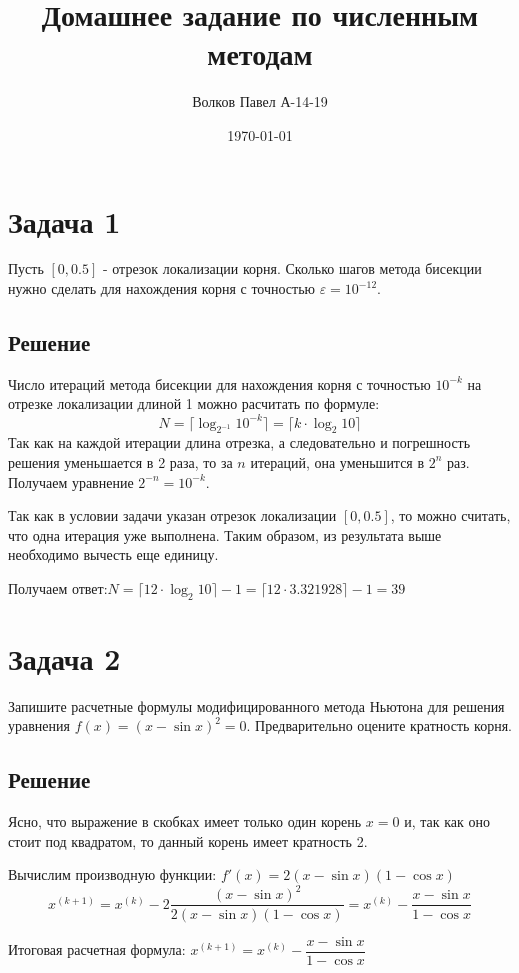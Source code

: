\documentclass[a4paper,12pt]{report} %
\author{Волков Павел А-14-19}
\title{ Домашнее задание по численным методам}
\date{\today}
\begin{document}
\section*{Задача 1}

Пусть $[ 0, 0.5]$ - отрезок локализации корня. Сколько шагов метода бисекции нужно сделать для нахождения корня с точностью $\varepsilon = 10^{-12}$.

\subsection*{Решение}
Число итераций метода бисекции для нахождения корня с точностью $10^{-k}$ на отрезке локализации длиной 1 можно расчитать по формуле:
\[
	N = \lceil \log_{2^{-1}}10^{-k}\rceil = \lceil k\cdot \log_2 10\rceil
\]
Так как на каждой итерации длина отрезка, а следовательно и погрешность решения уменьшается в 2 раза, то за $n$ итераций, она уменьшится в $2^n$ раз. Получаем уравнение $2^{-n} = 10^{-k}$.

Так как в условии задачи указан отрезок локализации $[0, 0.5]$, то можно считать, что одна итерация уже выполнена. Таким образом, из результата выше необходимо вычесть еще единицу.

Получаем ответ:$ N =  \lceil 12\cdot \log_2 10\rceil - 1 = \lceil 12 \cdot 3.321928 \rceil - 1 = 39$

\section*{Задача 2}
Запишите расчетные формулы модифицированного метода Ньютона для решения уравнения $f(x) = (x - \sin x)^2 = 0$. Предварительно оцените кратность корня.

\subsection*{Решение}

Ясно, что выражение в скобках имеет только один корень $x = 0$ и, так как оно стоит под квадратом, то данный корень имеет кратность 2.

Вычислим производную функции: $f'(x) = 2(x - \sin x) (1 - \cos x)$
\[
	x^{(k+1)} = x^{(k)} - 2 \frac{(x - \sin x)^2}{2(x - \sin x) (1 - \cos x)} = x^{(k)} - \frac{x - \sin x}{1 - \cos x}
\]

Итоговая расчетная формула: $x^{(k+1)} = x^{(k)} - \dfrac{x - \sin x}{1 - \cos x}$
\end{document}
